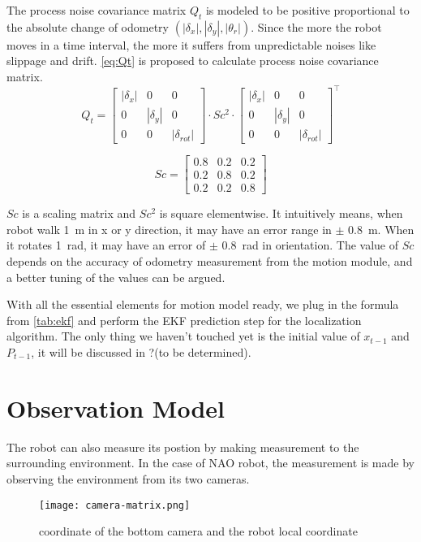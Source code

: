 The process noise covariance matrix $Q_t$ is modeled to be positive proportional to the absolute change of odometry $(|\delta_{x}|, |\delta_{y}|, |\theta_{r}|)$. Since the more the robot moves in a time interval, the more it suffers from unpredictable noises like slippage and drift. \autoref{eq:Qt} is proposed to calculate process noise covariance matrix.
\begin{equation}\label{eq:Qt} 
Q_t = 
\begin{bmatrix}
|\delta_x| & 0 & 0\\ 
0 &  |\delta_y|& 0\\ 
0 & 0 & |\delta_{rot}|
\end{bmatrix} 
\cdot
Sc^2 
\cdot
\begin{bmatrix}
|\delta_x| & 0 & 0\\ 
0 &  |\delta_y|& 0\\ 
0 & 0 & |\delta_{rot}|
\end{bmatrix}^\top
\end{equation}

\begin{equation}\label{eq:Sc} 
Sc = \begin{bmatrix}
0.8 & 0.2 & 0.2\\ 
0.2 &  0.8 & 0.2\\ 
0.2 & 0.2 & 0.8
\end{bmatrix}
\end{equation}

$Sc$ is a scaling matrix and $Sc^2$ is square elementwise. It intuitively means, when robot walk \SI{1}{\meter} in x or y direction, it may have an error range in $\pm$ \SI{0.8}{\meter}. When it rotates \SI{1}{\radian}, it may have an error of $\pm$ \SI{0.8}{\radian} in orientation. The value of $Sc$ depends on the accuracy of odometry measurement from the motion module, and a better tuning of the values can be argued.

With all the essential elements for motion model ready, we plug in the formula from \autoref{tab:ekf} and perform the \gls{EKF} prediction step for the localization algorithm. The only thing we haven't touched yet is the initial value of $x_{t-1}$ and $P_{t-1}$, it will be discussed in ?(to be determined).  



\section{Observation Model}\label{sec:Observation Model}
The robot can also measure its postion by making measurement to the surrounding environment. In the case of NAO robot, the measurement is made by observing the environment from its two cameras. 

\begin{figure}[h!]
  \centering
  \texttt{[image: camera-matrix.png]}
  \caption{coordinate of the bottom camera and the robot local coordinate}
  \label{fig:motion_model}
\end{figure}

